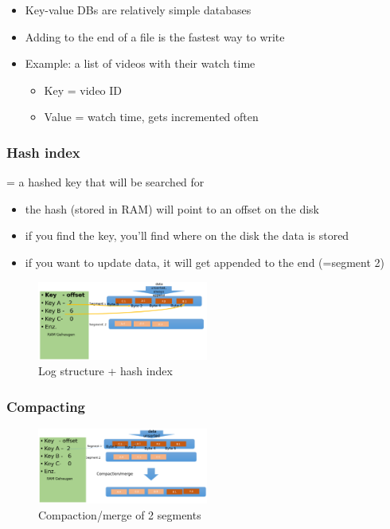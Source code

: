 \documentclass{article}
\begin{document}
\begin{itemize}
    \item Key-value DBs are relatively simple databases
    \item Adding to the end of a file is the fastest way to write
    \item Example: a list of videos with their watch time
    \begin{itemize}
        \item Key =  video ID
        \item Value = watch time, gets incremented often
    \end{itemize}
\end{itemize}

\subsubsection{Hash index}

= a hashed key that will be searched for

\begin{itemize}
    \item the hash (stored in RAM) will point to an offset on the disk
    \item if you find the key, you'll find where on the disk the data is stored
    \item if you want to update data, it will get appended to the end (=segment 2)
\end{itemize}

\begin{figure}[H]
    \centering
    \includegraphics[width=0.5\textwidth]{key-value.png}
    \caption{Log structure + hash index}
\end{figure}

\subsubsection{Compacting}

\begin{figure}[H]
    \centering
    \includegraphics[width=0.5\textwidth]{key-value-compacting.png}
    \caption{Compaction/merge of 2 segments}
\end{figure}
\end{document}
